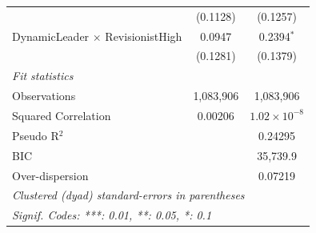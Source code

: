 \begin{tabular}{lcc}
                                           & (0.1128)             & (0.1257)\\   
   DynamicLeader $\times$ RevisionistHigh  & 0.0947               & 0.2394$^{*}$\\   
                                           & (0.1281)             & (0.1379)\\   
   \midrule
   \emph{Fit statistics}\\
   Observations                            & 1,083,906            & 1,083,906\\  
   Squared Correlation                     & 0.00206              & $1.02\times 10^{-8}$\\   
   Pseudo R$^2$                            &                      & 0.24295\\  
   BIC                                     &                      & 35,739.9\\  
   Over-dispersion                         &                      & 0.07219\\  
   \midrule \midrule
   \multicolumn{3}{l}{\emph{Clustered (dyad) standard-errors in parentheses}}\\
   \multicolumn{3}{l}{\emph{Signif. Codes: ***: 0.01, **: 0.05, *: 0.1}}\\
\end{tabular}
\par\endgroup


